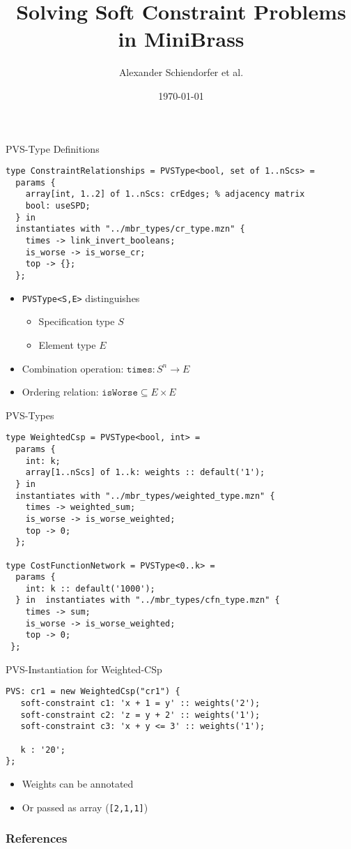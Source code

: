 \documentclass[handout,10pt,xcolor={dvipsnames},fleqn]{beamer}
\title{Solving Soft Constraint Problems in MiniBrass}
\author{Alexander Schiendorfer et al.}
\date{\today}
\begin{document}
\titleframe


%


\begin{frame}[fragile]{PVS-Type Definitions}
\begin{lstlisting}
type ConstraintRelationships = PVSType<bool, set of 1..nScs> = 
  params { 
    array[int, 1..2] of 1..nScs: crEdges; % adjacency matrix
    bool: useSPD;
  } in 
  instantiates with "../mbr_types/cr_type.mzn" {
    times -> link_invert_booleans;
    is_worse -> is_worse_cr;
    top -> {};
  };
\end{lstlisting}
\begin{itemize}
\item \texttt{PVSType<S,E>} distinguishes
\begin{itemize}
\item[] Specification type $S$ 
\item[] Element type $E$
\end{itemize} 
\item Combination operation: $\mathtt{times} : S^n \to E$
\item Ordering relation: $\mathtt{isWorse} \subseteq E \times E$
\end{itemize}
\end{frame}

\begin{frame}[fragile]{PVS-Types}
\begin{lstlisting}
type WeightedCsp = PVSType<bool, int> = 
  params {
    int: k; 
    array[1..nScs] of 1..k: weights :: default('1');
  } in  
  instantiates with "../mbr_types/weighted_type.mzn" {
    times -> weighted_sum;
    is_worse -> is_worse_weighted;
    top -> 0;
  };
  
type CostFunctionNetwork = PVSType<0..k> = 
  params {
    int: k :: default('1000'); 
  } in  instantiates with "../mbr_types/cfn_type.mzn" {
    times -> sum;
    is_worse -> is_worse_weighted; 
    top -> 0;
 };
\end{lstlisting}
\end{frame}

\begin{frame}[fragile]{PVS-Instantiation for Weighted-CSp}
\begin{lstlisting}
PVS: cr1 = new WeightedCsp("cr1") {
   soft-constraint c1: 'x + 1 = y' :: weights('2');
   soft-constraint c2: 'z = y + 2' :: weights('1');
   soft-constraint c3: 'x + y <= 3' :: weights('1');
   
   k : '20';
}; 
\end{lstlisting}
\begin{itemize}
\item Weights can be annotated 
\item Or passed as array (\texttt{[2,1,1]}) %
\end{itemize}
\end{frame}

%

%

%

%


%

\begin{frame}[allowframebreaks]
        \frametitle{References}
        
        
\end{frame}
\end{document}
